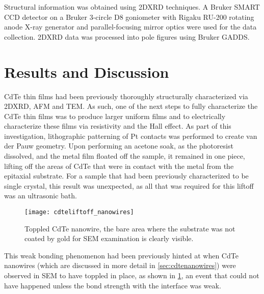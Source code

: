 Structural information was obtained using 2DXRD techniques.
A Bru\-ker SMART CCD detector on a Bruker 3-circle D8 goniometer with Rigaku RU-200 rotating anode X-ray generator and parallel-focusing mirror optics were used for the data collection.
2DXRD data was processed into pole figures using Bruker GADDS\@.
\section{Results and Discussion}
CdTe thin films had been previously thoroughly structurally characterized via 2DXRD, AFM and TEM\@. As such, one of the next steps to fully characterize the CdTe thin films was to produce larger uniform films\cite{stephen-thesis} and to electrically characterize these films via resistivity and the Hall effect.
As part of this investigation, lithographic patterning of Pt contacts was performed to create van der Pauw geometry.
Upon performing an acetone soak, as the photoresist dissolved, and the metal film floated off the sample, it remained in one piece, lifting off the areas of CdTe that were in contact with the metal from the epitaxial substrate.
For a sample that had been previously characterized to be single crystal, this result was unexpected, as all that was required for this liftoff was an ultrasonic bath.
\begin{figure}
 \centering \texttt{[image: cdteliftoff\_nanowires]}
 \caption[Toppled CdTe nanowire]{\label{fig:cdteliftoff_nanowires}Toppled CdTe nanowire, the bare area where the substrate was not coated by gold for SEM examination is clearly visible.}
\end{figure}
This weak bonding phenomenon had been previously hinted at when CdTe nanowires (which are discussed in more detail in \cref{sec:cdtenanowires}) were observed in SEM to have toppled in place, as shown in \cref{fig:cdteliftoff_nanowires}, an event that could not have happened unless the bond strength with the interface was weak.

